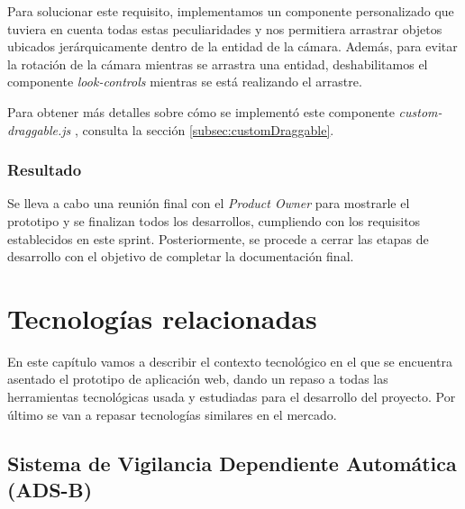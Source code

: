 \documentclass[a4paper, 11pt]{book}
\begin{document}
Para solucionar este requisito, implementamos un componente personalizado que tuviera en cuenta todas estas peculiaridades y nos permitiera arrastrar objetos ubicados jerárquicamente dentro de la entidad de la cámara. Además, para evitar la rotación de la cámara mientras se arrastra una entidad, deshabilitamos el componente \emph{look-controls} mientras se está realizando el arrastre.

Para obtener más detalles sobre cómo se implementó este componente \emph{custom-draggable.js} , consulta la sección \ref{subsec:customDraggable}.

\subsection{Resultado}
Se lleva a cabo una reunión final con el \emph{Product Owner} para mostrarle el prototipo y se finalizan todos los desarrollos, cumpliendo con los requisitos establecidos en este sprint. Posteriormente, se procede a cerrar las etapas de desarrollo con el objetivo de completar la documentación final. 

\clearpage
\chapter{Tecnologías relacionadas}
\label{chap:tecnologias}
En este capítulo vamos a describir el contexto tecnológico en el que se encuentra asentado el prototipo de aplicación web, dando un repaso a todas las herramientas tecnológicas usada y estudiadas para el desarrollo del proyecto.
Por último se van a repasar tecnologías similares en el mercado.
\section{Sistema de Vigilancia Dependiente Automática (ADS-B)}
\label{sec:adsb}
\end{document}
